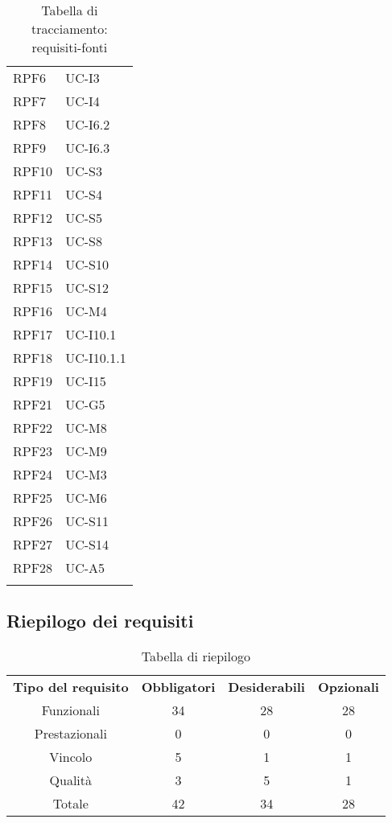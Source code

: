 \begin{longtable}{| p{5cm} | p{5cm} |}
		RPF6 & UC-I3\\
		\rowcolor{LightGray}
		RPF7 & UC-I4\\
		RPF8 & UC-I6.2\\
		\rowcolor{LightGray}
		RPF9 & UC-I6.3\\
		RPF10 & UC-S3\\
		\rowcolor{LightGray}
		RPF11 & UC-S4\\
		RPF12 & UC-S5\\
		\rowcolor{LightGray}
		RPF13 & UC-S8\\
		RPF14 & UC-S10\\
		\rowcolor{LightGray}
		RPF15 & UC-S12\\
		RPF16 & UC-M4\\
		\rowcolor{LightGray}
		RPF17 & UC-I10.1\\
		RPF18 & UC-I10.1.1\\
		\rowcolor{LightGray}
		RPF19 & UC-I15\\
		\rowcolor{LightGray}
		RPF21 & UC-G5\\
		RPF22 & UC-M8\\
		\rowcolor{LightGray}
		RPF23 & UC-M9\\
		RPF24 & UC-M3\\
		\rowcolor{LightGray}
		RPF25 & UC-M6\\
		RPF26 & UC-S11\\	
		\rowcolor{LightGray}
		RPF27 & UC-S14\\
		RPF28 & UC-A5\\
		\rowcolor{LightGray}
		\hline
		\caption{Tabella di tracciamento: requisiti-fonti}
\end{longtable}

\subsection{Riepilogo dei requisiti}
\begin{table}[h]
\centering
\begin{tabular}{| c | c | c | c |}
		\rowcolor{LightBlue}
		\color{white}\bfseries Tipo del requisito & \color{white}\bfseries Obbligatori & \color{white}\bfseries Desiderabili & \color{white}\bfseries Opzionali \\[0.25cm]
		 Funzionali & 34 & 28 & 28 \\
		 Prestazionali & 0 & 0 & 0 \\
		 Vincolo & 5 & 1 & 1 \\
		 Qualità & 3 & 5 & 1 \\
		 Totale & 42 & 34 & 28 \\ \hline
\end{tabular}
		\caption{Tabella di riepilogo}
\end{table}


\newpage